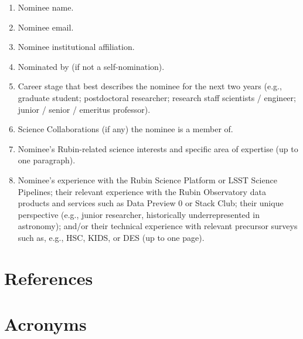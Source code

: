 \documentclass[OPS,toc]{lsstdoc}
\begin{document}
\begin{enumerate}
\item Nominee name.
\item Nominee email.
\item Nominee institutional affiliation.
\item Nominated by (if not a self-nomination).
\item Career stage that best describes the nominee for the next two years (e.g., graduate student; postdoctoral researcher; research staff scientists / engineer; junior / senior / emeritus professor).
\item Science Collaborations (if any) the nominee is a member of.
\item Nominee’s Rubin-related science interests and specific area of expertise (up to one paragraph).
\item Nominee’s experience with the Rubin Science Platform or LSST Science Pipelines; their relevant experience with the Rubin Observatory data products and services such as Data Preview 0 or Stack Club; their unique perspective (e.g., junior researcher, historically underrepresented in astronomy); and/or their technical experience with relevant precursor surveys such as, e.g., HSC, KIDS, or DES (up to one page).
\end{enumerate}

\clearpage

\section{References} \label{sec:bib}
\renewcommand{\refname}{} %


\section{Acronyms} \label{sec:acronyms}

\end{document}
